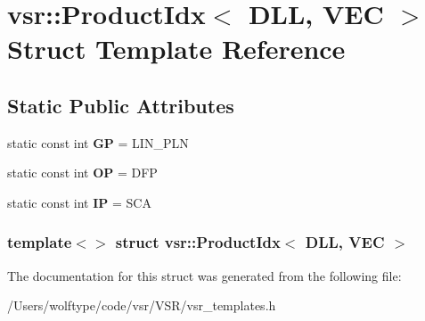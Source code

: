 \hypertarget{structvsr_1_1_product_idx_3_01_d_l_l_00_01_v_e_c_01_4}{\section{vsr\-:\-:Product\-Idx$<$ D\-L\-L, V\-E\-C $>$ Struct Template Reference}
\label{structvsr_1_1_product_idx_3_01_d_l_l_00_01_v_e_c_01_4}
}
\subsection*{Static Public Attributes}
\begin{DoxyCompactItemize}
\item 
\hypertarget{structvsr_1_1_product_idx_3_01_d_l_l_00_01_v_e_c_01_4_a053801c0c9c93532ae90912d7219c9c7}{static const int {\bfseries G\-P} = L\-I\-N\-\_\-\-P\-L\-N}\label{structvsr_1_1_product_idx_3_01_d_l_l_00_01_v_e_c_01_4_a053801c0c9c93532ae90912d7219c9c7}

\item 
\hypertarget{structvsr_1_1_product_idx_3_01_d_l_l_00_01_v_e_c_01_4_a941dd8248f6c2f3eaf8e6fccc1cb38be}{static const int {\bfseries O\-P} = D\-F\-P}\label{structvsr_1_1_product_idx_3_01_d_l_l_00_01_v_e_c_01_4_a941dd8248f6c2f3eaf8e6fccc1cb38be}

\item 
\hypertarget{structvsr_1_1_product_idx_3_01_d_l_l_00_01_v_e_c_01_4_ad397095a49a8d772cecab1408ac53f06}{static const int {\bfseries I\-P} = S\-C\-A}\label{structvsr_1_1_product_idx_3_01_d_l_l_00_01_v_e_c_01_4_ad397095a49a8d772cecab1408ac53f06}

\end{DoxyCompactItemize}
\subsubsection*{template$<$$>$ struct vsr\-::\-Product\-Idx$<$ D\-L\-L, V\-E\-C $>$}



The documentation for this struct was generated from the following file\-:\begin{DoxyCompactItemize}
\item 
/\-Users/wolftype/code/vsr/\-V\-S\-R/vsr\-\_\-templates.\-h\end{DoxyCompactItemize}
